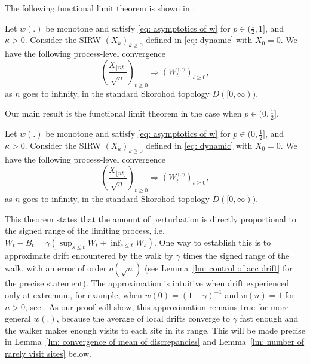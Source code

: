 \documentclass[EJP]{ejpecp} %
\begin{document}
	The following functional limit theorem is shown in \cite{KMP23}: 
	\begin{theorem}
		Let $w(.)$ be monotone and satisfy \eqref{eq: asymptotics of w} for $p\in (\frac{1}{2},1]$, and $\kappa >0 $. Consider the SIRW $(X_k)_{k\geq 0}$ defined in \eqref{eq: dynamic} with $X_0 =0$. We have the following process-level convergence
		\[
		\left(  \frac{X_{\lfloor nt \rfloor }}{\sqrt{n}}  \right)_{t\geq 0} \Longrightarrow \left( W^{\gamma,\gamma}_{t}\right)_{t\geq 0},
		\] 
		as $n$ goes to infinity, in the standard Skorohod topology $D([0,\infty) ).$
	\end{theorem}
\begin{samepage}
	Our main result is the functional limit theorem in the case when $p\in (0,\frac{1}{2}]$.
	\begin{theorem}\label{th: main}
		Let $w(.)$ be monotone and satisfy \eqref{eq: asymptotics of w} for $p\in (0,\frac{1}{2}]$, and $\kappa >0 $. Consider the SIRW $(X_k)_{k\geq 0}$ defined in \eqref{eq: dynamic} with $X_0 =0$. We have the following process-level convergence
		\[
		\left(  \frac{X_{\lfloor nt \rfloor }}{\sqrt{n}}  \right)_{t\geq 0} \Longrightarrow \left( W^{\gamma,\gamma}_{t}\right)_{t\geq 0},
		\]
		as $n$ goes to infinity, in the standard Skorohod topology $D([0,\infty) ).$
	\end{theorem}
\end{samepage}

This theorem states that the amount of perturbation is directly proportional to the signed range of the limiting process, i.e. $W_t - B_t = \gamma \left( \sup_{s \le t} W_t + \inf _{s \le t} W_s \right) $. 
One way to establish this is to approximate drift encountered by the walk by $\gamma$ times the signed range of the walk, with an error of order $o\left(\sqrt{n} \right)$ (see Lemma~\ref{lm: control of acc drift} for the precise statement). 
The approximation is intuitive when drift experienced only at extremum, for example, when $w(0) = (1 - \gamma)^{-1}$ and $w(n) = 1$ for $n > 0$, see \cite{Dav99}. 
As our proof will show, this approximation remains true for more general $w(.)$, because the average of local drifts converge to $\gamma$ fast enough and the walker makes enough visits to each site in its range. 
This will be made precise in Lemma~\ref{lm: convergence of mean of discrepancies} and Lemma~\ref{lm: number of rarely visit sites} below. 
\end{document}

